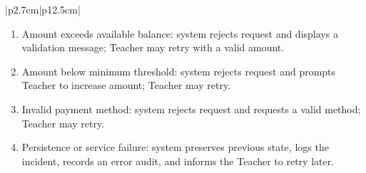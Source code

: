 \begin{table}[H]
\begin{tabular}{|p{2.7cm}|p{12.5cm}|}
\begin{minipage}[t]{\linewidth}
\begin{enumerate}[topsep=0pt,itemsep=1pt,parsep=0pt,partopsep=0pt]
                \item Amount exceeds available balance: system rejects request and displays a validation message; Teacher may retry with a valid amount.
                \item Amount below minimum threshold: system rejects request and prompts Teacher to increase amount; Teacher may retry.
                \item Invalid payment method: system rejects request and requests a valid method; Teacher may retry.
                \item Persistence or service failure: system preserves previous state, logs the incident, records an error audit, and informs the Teacher to retry later.
            \end{enumerate}
        \end{minipage} \\ \hline
    \end{tabular}
    \label{tab:teacher-request-payout}
\end{table}


